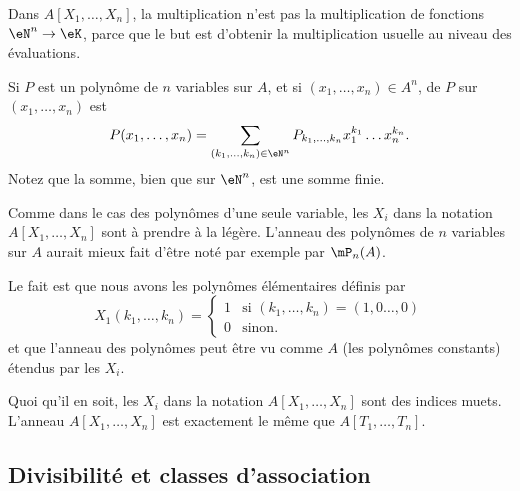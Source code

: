 \begin{normaltext}
	Dans \( A[X_1,\ldots, X_n]\), la multiplication n'est pas la multiplication de fonctions \( \eN^n\to \eK\), parce que le but est d'obtenir la multiplication usuelle au niveau des évaluations.
\end{normaltext}

\begin{definition}
	Si \( P\) est un polynôme de \( n\) variables sur \( A\), et si \( (x_1,\ldots, x_n)\in A^n\),  de \( P\) sur \( (x_1,\ldots, x_n)\) est
	\begin{equation}
		P(x_1,\ldots, x_n)=\sum_{(k_1,\ldots, k_n)\in \eN^n}P_{k_1,\ldots, k_n}x_1^{k_1}\ldots x_n^{k_n}.
	\end{equation}
	Notez que la somme, bien que sur \( \eN^n\), est une somme finie.
\end{definition}

\begin{normaltext}
	Comme dans le cas des polynômes d'une seule variable, les \( X_i\) dans la notation \( A[X_1,\ldots, X_n]\) sont à prendre à la légère. L'anneau des polynômes de \( n\) variables sur \( A\) aurait mieux fait d'être noté par exemple par \( \mP_n(A)\).

	Le fait est que nous avons les polynômes élémentaires définis par
	\begin{equation}
		X_1(k_1,\ldots, k_n)=\begin{cases}
			1 & \text{si } (k_1,\ldots, k_n)=(1,0\ldots, 0) \\
			0 & \text{sinon. }
		\end{cases}
	\end{equation}
	et que l'anneau des polynômes peut être vu comme \( A\) (les polynômes constants) étendus par les \( X_i\).

	Quoi qu'il en soit, les \( X_i\) dans la notation \( A[X_1,\ldots, X_n]\) sont des indices muets. L'anneau \( A[X_1,\ldots, X_n]\) est exactement le même que \( A[T_1,\ldots, T_n]\).
\end{normaltext}

\subsection{Divisibilité et classes d'association}
\label{DivisibiliteAnneauxIntegres}

